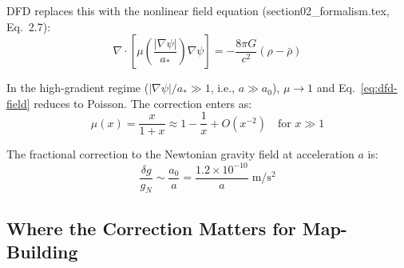 \documentclass[11pt]{article}
\theoremstyle{definition}
\theoremstyle{remark}
\newcommand{\ee}[1]{\times10^{#1}}
\begin{document}
DFD replaces this with the nonlinear field equation (section02\_formalism.tex,
Eq.~2.7):
\begin{equation}
\nabla\cdot\left[\mu\!\left(\frac{|\nabla\psi|}{a_*}\right)\nabla\psi\right]
= -\frac{8\pi G}{c^2}(\rho - \bar{\rho})
\label{eq:dfd-field}
\end{equation}

In the high-gradient regime ($|\nabla\psi|/a_* \gg 1$, i.e., $a \gg a_0$),
$\mu \to 1$ and Eq.~\eqref{eq:dfd-field} reduces to Poisson. The
correction enters as:
\begin{equation}
\mu(x) = \frac{x}{1+x} \approx 1 - \frac{1}{x} + O(x^{-2})
\quad\text{for } x \gg 1
\label{eq:mu-expansion}
\end{equation}

The fractional correction to the Newtonian gravity field at acceleration
$a$ is:
\begin{equation}
\frac{\delta g}{g_N} \sim \frac{a_0}{a} = \frac{1.2\ee{-10}}{a}\;\mathrm{m/s^2}
\label{eq:dfd-correction}
\end{equation}

\subsection{Where the Correction Matters for Map-Building}
\end{document}
